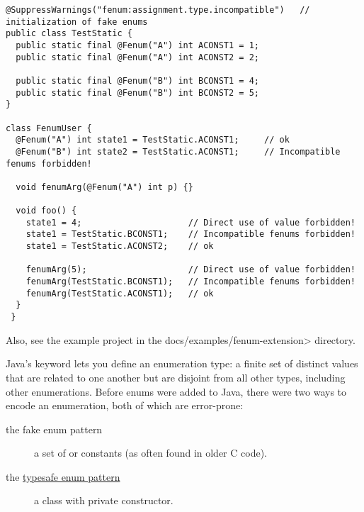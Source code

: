 \begin{Verbatim}
@SuppressWarnings("fenum:assignment.type.incompatible")   // initialization of fake enums
public class TestStatic {
  public static final @Fenum("A") int ACONST1 = 1;
  public static final @Fenum("A") int ACONST2 = 2;

  public static final @Fenum("B") int BCONST1 = 4;
  public static final @Fenum("B") int BCONST2 = 5;
}

class FenumUser {
  @Fenum("A") int state1 = TestStatic.ACONST1;     // ok
  @Fenum("B") int state2 = TestStatic.ACONST1;     // Incompatible fenums forbidden!

  void fenumArg(@Fenum("A") int p) {}

  void foo() {
    state1 = 4;                     // Direct use of value forbidden!
    state1 = TestStatic.BCONST1;    // Incompatible fenums forbidden!
    state1 = TestStatic.ACONST2;    // ok

    fenumArg(5);                    // Direct use of value forbidden!
    fenumArg(TestStatic.BCONST1);   // Incompatible fenums forbidden!
    fenumArg(TestStatic.ACONST1);   // ok
  }
 }
\end{Verbatim}

Also, see the example project in the \<docs/examples/fenum-extension> directory.



Java's
\href{https://docs.oracle.com/javase/specs/jls/se10/html/jls-8.html#jls-8.9}{}
keyword lets you define an enumeration type: a finite set of distinct values
that are related to one another but are disjoint from all other
types, including other enumerations.
Before enums were added to Java, there were two ways to encode an
enumeration, both of which are error-prone:

\begin{description}
\item[the fake enum pattern]  a set of  or 
  constants (as often found in older C code).

\item[the \href{https://www.oracle.com/technetwork/java/page1-139488.html}{typesafe
enum pattern}]  a class with private constructor.
\end{description}

